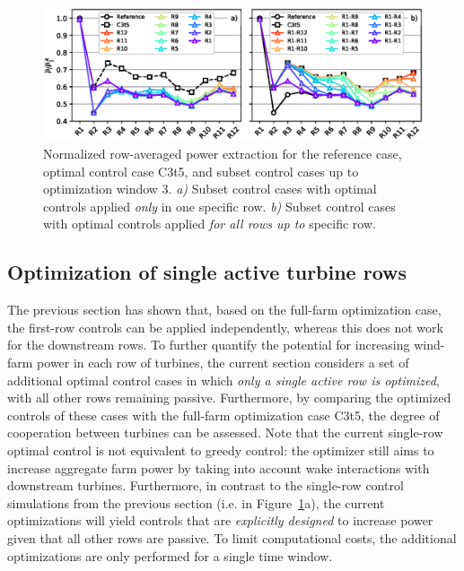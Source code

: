 	\begin{figure}
		\includegraphics[width=\textwidth]{chapters/analysis_induction_control/multirow.eps}
		\caption[Normalized row-averaged power extraction for the reference case, optimal control case C3t5, and subset control cases up to optimization window 3.]{Normalized row-averaged power extraction for the reference case, optimal control case C3t5, and subset control cases up to optimization window 3. \emph{a)} Subset control cases with optimal controls applied \emph{only} in one specific row. \emph{b)} Subset control cases with optimal controls applied \emph{for all rows up to} specific row. \label{fig:multirow}}
	\end{figure}

	\subsection{Optimization of single active turbine rows}\label{sec:optimization_single}
	The previous section has shown that, based on the full-farm optimization case, the first-row controls can be applied independently, whereas this does not work for the downstream rows. To further quantify the potential for increasing wind-farm power in each row of turbines, the current section considers a set of additional optimal control cases in which \emph{only a single active row is optimized}, with all other rows remaining passive. Furthermore, by comparing the optimized controls of these cases with the full-farm optimization case C3t5, the degree of cooperation between turbines can be assessed. Note that the current single-row optimal control is not equivalent to greedy control: the optimizer still aims to increase aggregate farm power by taking into account wake interactions with downstream turbines. Furthermore, in contrast to the single-row control simulations from the previous section (i.e. in Figure~\ref{fig:multirow}a), the current optimizations will yield controls that are \emph{explicitly designed} to increase power given that all other rows are passive. To limit computational costs, the additional optimizations are only performed for a single time window. 
	
